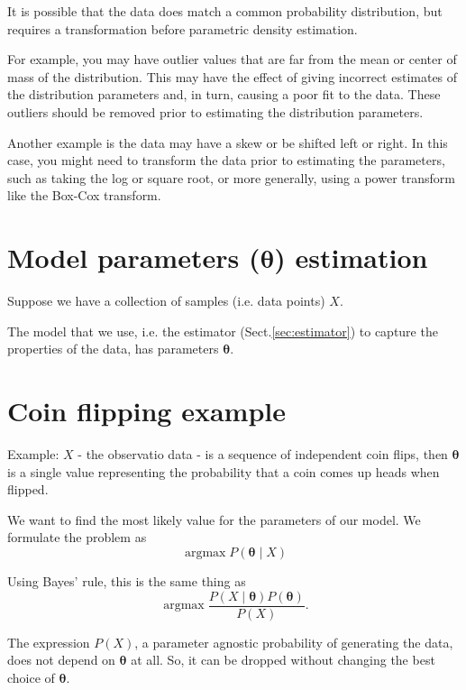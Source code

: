 It is possible that the data does match a common probability distribution, but
requires a transformation before parametric density estimation.

For example, you may have outlier values that are far from the mean or center of
mass of the distribution. This may have the effect of giving incorrect estimates
of the distribution parameters and, in turn, causing a poor fit to the data.
These outliers should be removed prior to estimating the distribution
parameters.

Another example is the data may have a skew or be shifted left or right. In this
case, you might need to transform the data prior to estimating the parameters,
such as taking the log or square root, or more generally, using a power
transform like the Box-Cox transform.



\section{Model parameters ($\boldsymbol{\theta}$) estimation}

Suppose we have a collection of samples (i.e. data points) $X$.

The model that we use, i.e. the estimator (Sect.\ref{sec:estimator}) to capture
the properties of the data, has parameters $\boldsymbol{\theta}$.

\section{Coin flipping example}

Example: $X$ - the observatio data - is a sequence of independent coin flips,
then $\boldsymbol{\theta}$ is a single value representing the probability that a
coin comes up heads when flipped.

We want to find the most likely value for the parameters of our model.
We formulate the problem as 
\begin{equation}
\mathop{\mathrm{argmax}} P(\boldsymbol{\theta}\mid X)
\end{equation}

Using Bayes' rule, this is the same thing as
\begin{equation}
\mathop{\mathrm{argmax}} \frac{P(X \mid \boldsymbol{\theta})P(\boldsymbol{\theta})}{P(X)}.
\end{equation}

The expression $P(X)$, a parameter agnostic probability of generating the data,
 does not depend on $\boldsymbol{\theta}$ at all. So, it can be dropped without
 changing the best choice of $\boldsymbol{\theta}$.
 
